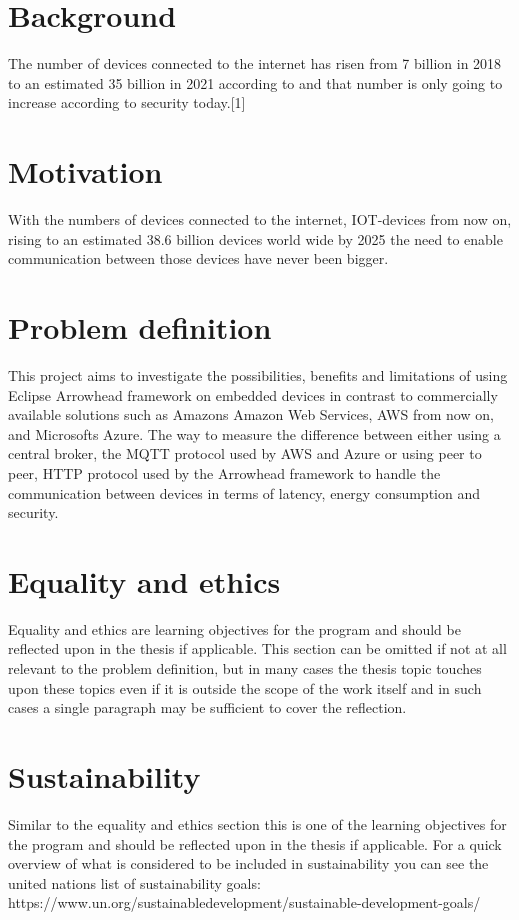 \section{Background}
The number of devices connected to the internet has risen from 7 billion in 2018 to an estimated 35 billion in 2021 according to and that number is only going to increase
according to security today.[1] %
\section{Motivation}
With the numbers of devices connected to the internet, IOT-devices 
from now on, rising to an estimated 38.6 billion devices world wide
by 2025 the need to enable communication between those devices have
never been bigger.


\section{Problem definition}
This project aims to investigate the possibilities, benefits and limitations of using Eclipse Arrowhead framework on embedded devices in contrast to commercially available solutions such
as Amazons Amazon Web Services, AWS 
from now on, and Microsofts Azure.  
The way to measure the difference between either 
using a central broker, the MQTT protocol used by AWS and Azure or using peer to peer, 
HTTP protocol used by the Arrowhead framework to handle the communication between devices in terms of latency, 
energy consumption and
security.

\section{Equality and ethics}
Equality and ethics are learning objectives for the program and should be reflected upon in the thesis if applicable. This section can be omitted if not at all relevant to the problem definition, but in many cases the thesis topic touches upon these topics even if it is outside the scope of the work itself and in such cases a single paragraph may be sufficient to cover the reflection.
\section{Sustainability}
Similar to the equality and ethics section this is one of the learning objectives for the program and should be reflected upon in the thesis if applicable. For a quick overview of what is considered to be included in sustainability you can see the united nations list of sustainability goals: https://www.un.org/sustainabledevelopment/sustainable-development-goals/
